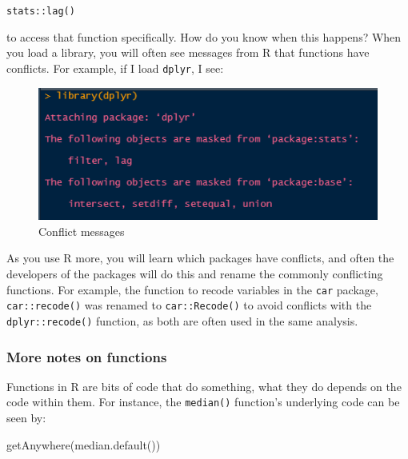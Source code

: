 \documentclass[
  letterpaper,
  DIV=11,
  numbers=noendperiod]{scrreprt}
\newenvironment{Shaded}{\begin{snugshade}}{\end{snugshade}}
\newcommand{\FunctionTok}[1]{\textcolor[rgb]{0.28,0.35,0.67}{#1}}
\newcommand{\NormalTok}[1]{\textcolor[rgb]{0.00,0.23,0.31}{#1}}
\begin{document}
\texttt{stats::lag()}

to access that function specifically. How do you know when this happens?
When you load a library, you will often see messages from R that
functions have conflicts. For example, if I load \texttt{dplyr}, I see:

\begin{figure}

{\centering \includegraphics{images/dplyrconflict.png}

}

\caption{Conflict messages}

\end{figure}

As you use R more, you will learn which packages have conflicts, and
often the developers of the packages will do this and rename the
commonly conflicting functions. For example, the function to recode
variables in the \texttt{car} package, \texttt{car::recode()} was
renamed to \texttt{car::Recode()} to avoid conflicts with the
\texttt{dplyr::recode()} function, as both are often used in the same
analysis.

\hypertarget{more-notes-on-functions}{%
\subsubsection{More notes on functions}\label{more-notes-on-functions}}

Functions in R are bits of code that do something, what they do depends
on the code within them. For instance, the \texttt{median()} function's
underlying code can be seen by:

\begin{Shaded}
\begin{Highlighting}[]
\FunctionTok{getAnywhere}\NormalTok{(}\FunctionTok{median.default}\NormalTok{())}
\end{Highlighting}
\end{Shaded}
\end{document}
